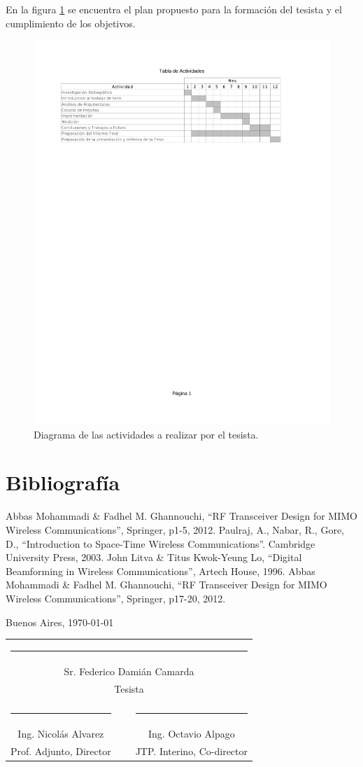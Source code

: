 \documentclass[a4paper]{article}
\newcommand{\signature}[7]{
	\vfill

	\begin{flushright}
		#1, \today
	\end{flushright}
	\vspace{3cm}

	\noindent
	\centering
	\begin{tabularx}{0.9\textwidth}{cXc}
		\multicolumn{3}{c}{\rule{5cm}{1pt}}\\
		\multicolumn{3}{c}{#2}\\
		\multicolumn{3}{c}{#3}\\
		\vspace{3cm}\\
		\rule{5cm}{1pt} & \hspace{2.5cm} & \rule{5cm}{1pt} \\
		#4 & ~ & #5 \\
		#6 & ~ & #7
	\end{tabularx}
	\vspace{1cm}
}
\begin{document}
En la figura \ref{TablaActividades} se encuentra el plan propuesto para la formación del tesista y el cumplimiento de los objetivos.

\begin{figure}[h!]
	\label{TablaActividades}
	\includegraphics[trim = 20mm 200mm 20mm 25mm, clip, width=\textwidth]{tabla_actividades}
	\caption{Diagrama de las actividades a realizar por el tesista.}
\end{figure}

\newpage

\section{Bibliografía}

\begin{thebibliography}{99}

 Abbas Mohammadi \& Fadhel M. Ghannouchi, ``RF Transceiver Design for MIMO Wireless Communications'', Springer, p1-5, 2012.
 Paulraj, A., Nabar, R., Gore, D., ``Introduction to Space-Time Wireless Communications''. Cambridge University Press, 2003.
 John Litva \& Titus Kwok-Yeung Lo, ``Digital Beamforming in Wireless Communications'', Artech House, 1996.
 Abbas Mohammadi \& Fadhel M. Ghannouchi, ``RF Transceiver Design for MIMO Wireless Communications'', Springer, p17-20, 2012.
\end{thebibliography}

\newpage

\signature{Buenos Aires}{Sr. Federico Damián Camarda}{Tesista}{Ing. Nicolás Alvarez}{Ing. Octavio Alpago}{Prof. Adjunto, Director}{JTP. Interino, Co-director}
\end{document}
